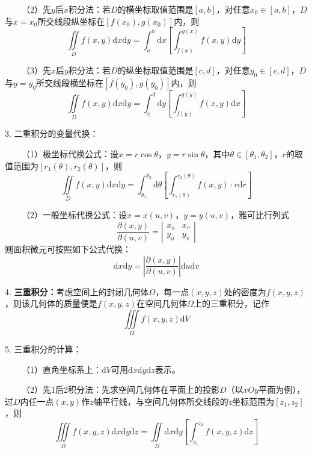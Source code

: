 ~~~~（2）先$y$后$x$积分法：若$D$的横坐标取值范围是$[a,b]$，对任意$x_0\in [a,b]$，$D$与$x=x_0$所交线段纵坐标在$[f(x_0),g(x_0)]$内，则
\begin{equation*}
    \iint\limits_{D}f(x,y)\mathrm{d}x\mathrm{d}y=\int_a^b\mathrm{d}x\left[\int_{f(x)}^{g(x)}f(x,y)\mathrm{d} y\right]
\end{equation*}

~~~~（3）先$x$后$y$积分法：若$D$的纵坐标取值范围是$[c,d]$，对任意$y_0\in [c,d]$，$D$与$y=y_0$所交线段横坐标在$[f(y_0),g(y_0)]$内，则
\begin{equation*}
    \iint\limits_{D}f(x,y)\mathrm{d}x\mathrm{d}y=\int_c^d\mathrm{d}y\left[\int_{f(y)}^{g(y)}f(x,y)\mathrm{d} x\right]
\end{equation*}

3. 二重积分的变量代换：

~~~~（1）极坐标代换公式：设$x=r\cos\theta$，$y=r\sin\theta$，其中$\theta\in [\theta_1,\theta_2]$，$r$的取值范围为$[r_1(\theta),r_2(\theta)]$，则
\begin{equation*}
    \iint\limits_D f(x,y)\mathrm{d}x\mathrm{d}y=\int_{\theta_1}^{\theta_2} \mathrm{d}\theta \left[\int_{r_1(\theta)}^{r_2(\theta)}f(x,y)\cdot r\mathrm{d}r\right]
\end{equation*}

~~~~（2）一般坐标代换公式：设$x=x(u,v)$，$y=y(u,v)$，雅可比行列式
\begin{equation*}
    \frac{\partial(x,y)}{\partial(u,v)}=\left|\begin{matrix}
        x_u&x_v\\
        y_u&y_v
    \end{matrix}\right|
\end{equation*}
则面积微元可按照如下公式代换：
\begin{equation*}
    \mathrm{d}x\mathrm{d}y=\left|\frac{\partial(x,y)}{\partial(u,v)}\right|\mathrm{d}u\mathrm{d}v
\end{equation*}

4. \textbf{三重积分：}考虑空间上的封闭几何体$\Omega$，每一点$(x,y,z)$处的密度为$f(x,y,z)$，则该几何体的质量便是$f(x,y,z)$在空间几何体$\Omega$上的三重积分，记作
\begin{equation*}
    \iiint\limits_\Omega f(x,y,z)\mathrm{d}V
\end{equation*}

5. 三重积分的计算：

~~~~（1）直角坐标系上：$\mathrm{d}V$可用$\mathrm{d}x\mathrm{d}y\mathrm{d}z$表示。

~~~~（2）先1后2积分法：先求空间几何体在平面上的投影$D$（以$xOy$平面为例），过$D$内任一点$(x,y)$作$z$轴平行线，与空间几何体所交线段的$z$坐标范围为$[z_1,z_2]$，则
\begin{equation*}
    \iiint\limits_\Omega f(x,y,z)\mathrm{d}x \mathrm{d}y\mathrm{d}z = \iint\limits_D \mathrm{d}x\mathrm{d}y\left[\int_{z_1}^{z_2} f(x,y,z)\mathrm{d}z\right]
\end{equation*}

